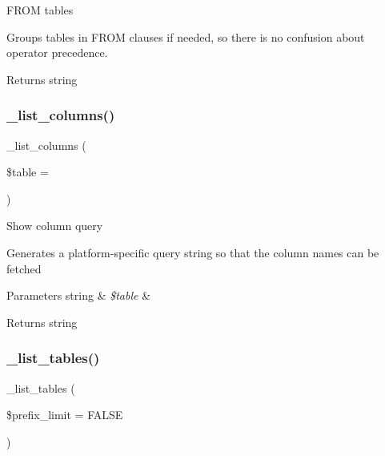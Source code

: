 F\+R\+OM tables

Groups tables in F\+R\+OM clauses if needed, so there is no confusion about operator precedence.

\begin{DoxyReturn}{Returns}
string 
\end{DoxyReturn}
\mbox{\label{class_c_i___d_b__mysqli__driver_a7ccb7f9c301fe7f0a9db701254142b63}} 
\subsubsection{\texorpdfstring{\+\_\+list\+\_\+columns()}{\_list\_columns()}}
{\footnotesize\ttfamily \+\_\+list\+\_\+columns (\begin{DoxyParamCaption}\item[{}]{\$table = {\ttfamily \textquotesingle{}\textquotesingle{}} }\end{DoxyParamCaption})\hspace{0.3cm}{\ttfamily [protected]}}

Show column query

Generates a platform-\/specific query string so that the column names can be fetched


\begin{DoxyParams}[1]{Parameters}
string & {\em \$table} & \\
\hline
\end{DoxyParams}
\begin{DoxyReturn}{Returns}
string 
\end{DoxyReturn}
\mbox{\label{class_c_i___d_b__mysqli__driver_a435c0f3ce54fe7daa178baa8532ebd54}} 
\subsubsection{\texorpdfstring{\+\_\+list\+\_\+tables()}{\_list\_tables()}}
{\footnotesize\ttfamily \+\_\+list\+\_\+tables (\begin{DoxyParamCaption}\item[{}]{\$prefix\+\_\+limit = {\ttfamily FALSE} }\end{DoxyParamCaption})\hspace{0.3cm}{\ttfamily [protected]}}

